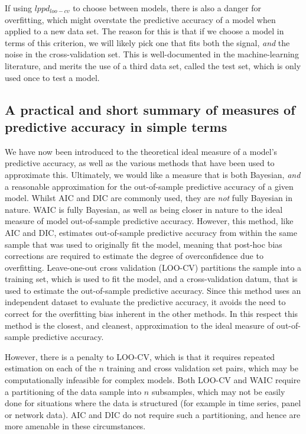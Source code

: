 \documentclass[11pt,fullpage]{book}
\begin{document}
If using $lppd_{loo-cv}$ to choose between models, there is also a danger for overfitting, which might overstate the predictive accuracy of a model when applied to a new data set. The reason for this is that if we choose a model in terms of this criterion, we will likely pick one that fits both the signal, \textit{and} the noise in the cross-validation set. This is well-documented in the machine-learning literature, and merits the use of a third data set, called the test set, which is only used once to test a model.

\subsection{A practical and short summary of measures of predictive accuracy in simple terms}\label{sec:Evaluation_practicalSimplePredictiveAcc}
We have now been introduced to the theoretical ideal measure of a model's predictive accuracy, as well as the various methods that have been used to approximate this. Ultimately, we would like a measure that is both Bayesian, \textit{and} a reasonable approximation for the out-of-sample predictive accuracy of a given model. Whilst AIC and DIC are commonly used, they are \textit{not} fully Bayesian in nature. WAIC is fully Bayesian, as well as being closer in nature to the ideal measure of model out-of-sample predictive accuracy. However, this method, like AIC and DIC, estimates out-of-sample predictive accuracy from within the same sample that was used to originally fit the model, meaning that post-hoc bias corrections are required to estimate the degree of overconfidence due to overfitting. Leave-one-out cross validation (LOO-CV) partitions the sample into a training set, which is used to fit the model, and a cross-validation datum, that is used to estimate the out-of-sample predictive accuracy. Since this method uses an independent dataset to evaluate the predictive accuracy, it avoids the need to correct for the overfitting bias inherent in the other methods. In this respect this method is the closest, and cleanest, approximation to the ideal measure of out-of-sample predictive accuracy. 

However, there is a penalty to LOO-CV, which is that it requires repeated estimation on each of the $n$ training and cross validation set pairs, which may be computationally infeasible for complex models. Both LOO-CV and WAIC require a partitioning of the data sample into $n$ subsamples, which may not be easily done for situations where the data is structured (for example in time series, panel or network data). AIC and DIC do not require such a partitioning, and hence are more amenable in these circumstances. 
\end{document}
